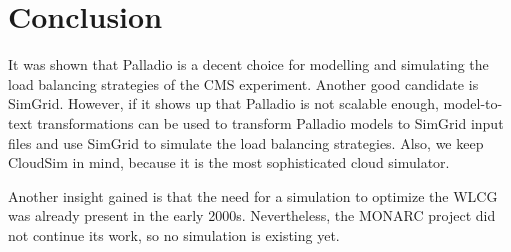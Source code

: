 \newpage
\begin{center}
\label{compare}
\end{center}

\chapter{Conclusion}

It was shown that Palladio is a decent choice for modelling and simulating  the load balancing strategies of the CMS experiment. Another good candidate is SimGrid. However, if it shows up that Palladio is not scalable enough, model-to-text  transformations can be used to transform Palladio models to SimGrid input files and use SimGrid to simulate the load balancing strategies. Also, we keep CloudSim in mind, because it is the most sophisticated cloud simulator.

Another insight gained is that the need for a simulation to optimize the WLCG was already present in the early 2000s. Nevertheless, the MONARC project did not continue its work, so no simulation is existing yet. 

